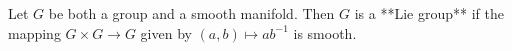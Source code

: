 Let $G$ be both a group and a smooth manifold. Then $G$ is a **Lie group** if the mapping $G \times G \to G$ given by $(a, b) \mapsto ab^{-1}$ is smooth.
